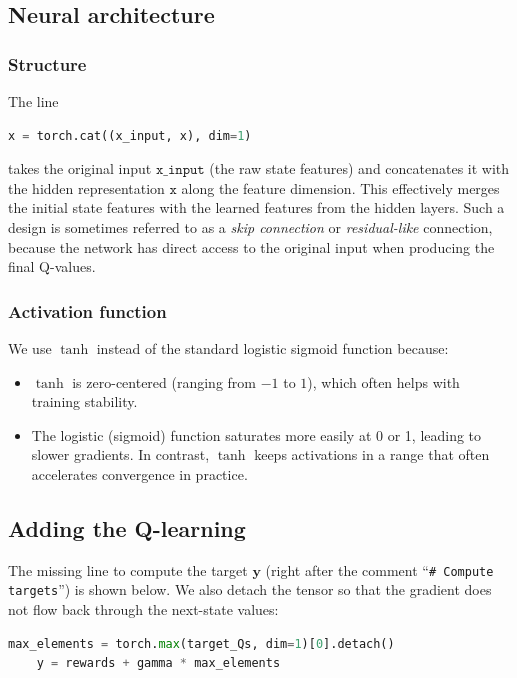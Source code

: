 \subsection{Neural architecture}

\subsubsection{Structure}
The line
\begin{lstlisting}[language=Python]
    x = torch.cat((x_input, x), dim=1)
\end{lstlisting}
takes the original input \(\texttt{x\_input}\) (the raw state features) and concatenates it with the hidden representation \(\texttt{x}\) along the feature dimension. This effectively merges the initial state features with the learned features from the hidden layers. Such a design is sometimes referred to as a \emph{skip connection} or \emph{residual-like} connection, because the network has direct access to the original input when producing the final Q-values.

\subsubsection{Activation function}
We use \(\tanh\) instead of the standard logistic sigmoid function because:
\begin{itemize}
  \item \(\tanh\) is zero-centered (ranging from \(-1\) to \(1\)), which often helps with training stability.
  \item The logistic (sigmoid) function saturates more easily at 0 or 1, leading to slower gradients. In contrast, \(\tanh\) keeps activations in a range that often accelerates convergence in practice.
\end{itemize}

\subsection{Adding the Q-learning}
The missing line to compute the target \(\mathbf{y}\) (right after the comment ``\texttt{\# Compute targets}'') is shown below. We also detach the tensor so that the gradient does not flow back through the next-state values:

\begin{lstlisting}[language=Python]
    max_elements = torch.max(target_Qs, dim=1)[0].detach()
    y = rewards + gamma * max_elements
\end{lstlisting}

